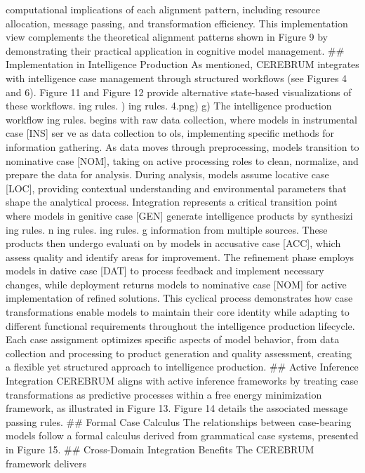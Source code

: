 \documentclass[
  11pt,
  letterpaper,
]{article}
\begin{document}
computational implications of each alignment pattern, including resource
allocation, message passing, and transformation efficiency. This
implementation view complements the theoretical alignment patterns shown
in Figure 9 by demonstrating their practical application in cognitive
model management. \#\# Implementation in Intelligence Production As
mentioned, CEREBRUM integrates with intelligence case management through
structured workflows (see Figures 4 and 6). Figure 11 and Figure 12
provide alternative state-based visualizations of these workflows. ing
rules. ) ing rules. 4.png) g) The intelligence production workflow ing
rules. begins with raw data collection, where models in instrumental
case {[}INS{]} ser ve as data collection to ols, implementing specific
methods for information gathering. As data moves through preprocessing,
models transition to nominative case {[}NOM{]}, taking on active
processing roles to clean, normalize, and prepare the data for analysis.
During analysis, models assume locative case {[}LOC{]}, providing
contextual understanding and environmental parameters that shape the
analytical process. Integration represents a critical transition point
where models in genitive case {[}GEN{]} generate intelligence products
by synthesizi ing rules. n ing rules. ing rules. g information from
multiple sources. These products then undergo evaluati on by models in
accusative case {[}ACC{]}, which assess quality and identify areas for
improvement. The refinement phase employs models in dative case
{[}DAT{]} to process feedback and implement necessary changes, while
deployment returns models to nominative case {[}NOM{]} for active
implementation of refined solutions. This cyclical process demonstrates
how case transformations enable models to maintain their core identity
while adapting to different functional requirements throughout the
intelligence production lifecycle. Each case assignment optimizes
specific aspects of model behavior, from data collection and processing
to product generation and quality assessment, creating a flexible yet
structured approach to intelligence production. \#\# Active Inference
Integration CEREBRUM aligns with active inference frameworks by treating
case transformations as predictive processes within a free energy
minimization framework, as illustrated in Figure 13. Figure 14 details
the associated message passing rules. \#\# Formal Case Calculus The
relationships between case-bearing models follow a formal calculus
derived from grammatical case systems, presented in Figure 15. \#\#
Cross-Domain Integration Benefits The CEREBRUM framework delivers
\end{document}
